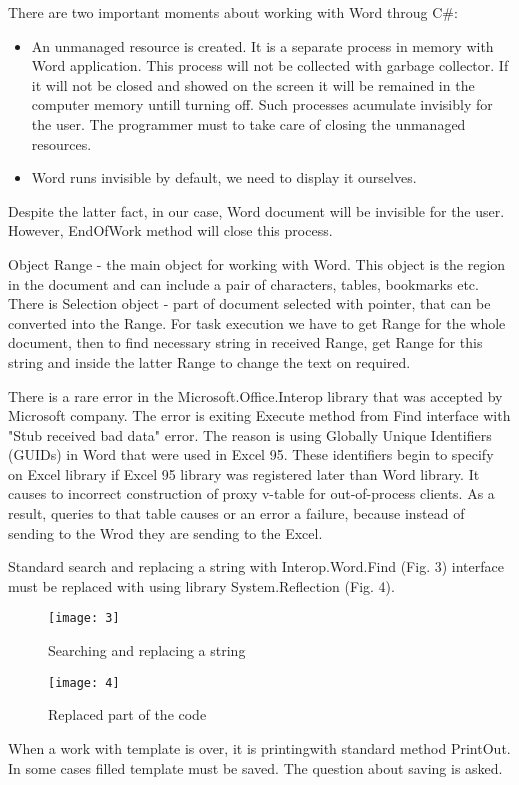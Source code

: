 \documentclass[12pt,journal,compsoc]{D:/Магистратура/English/bare_conf/IEEEtran}
\begin{document}
There are two important moments about working with Word throug C\#:
\begin{itemize}
\item An unmanaged resource is created. It is a separate process in memory with Word application. This process will not be collected with garbage collector. If it will not be closed and showed on the screen it will be remained in the computer memory untill turning off. Such processes acumulate invisibly for the user. The programmer must to take care of closing the unmanaged resources.
\item Word runs invisible by default, we need to display it ourselves.
\end{itemize}

Despite the latter fact, in our case, Word document will be invisible for the user. However, EndOfWork method will close this process.

Object Range - the main object for working with Word. This object is the region in the document and can include a pair of characters, tables, bookmarks etc. There is Selection object - part of document selected with pointer, that can be converted into the Range. For task execution we have to get Range for the whole document, then to find necessary string in received Range, get Range for this string and inside the latter Range to change the text on required.

There is a rare error in the Microsoft.Office.Interop library that was accepted by Microsoft company. The error is exiting Execute method from Find interface with "Stub received bad data" error. The reason is using Globally Unique Identifiers (GUIDs) in Word that were used in Excel 95. These identifiers begin to specify on Excel library if Excel 95 library was registered later than Word library. It causes to incorrect construction of proxy v-table for out-of-process clients. As a result, queries to that table causes or an error a failure, because instead of sending to the Wrod they are sending to the Excel.

Standard search and replacing a string with Interop.Word.Find (Fig. 3) interface must be replaced with using library System.Reflection (Fig. 4).
\begin{figure}[h]
\centering
\texttt{[image: 3]}
\centering
\caption{Searching and replacing a string}
\texttt{[image: 4]}
\centering
\caption{Replaced part of the code}
\end{figure}

When a work with template is over, it is printingwith standard method PrintOut. In some cases filled template must be saved. The question about saving is asked.
\end{document}
